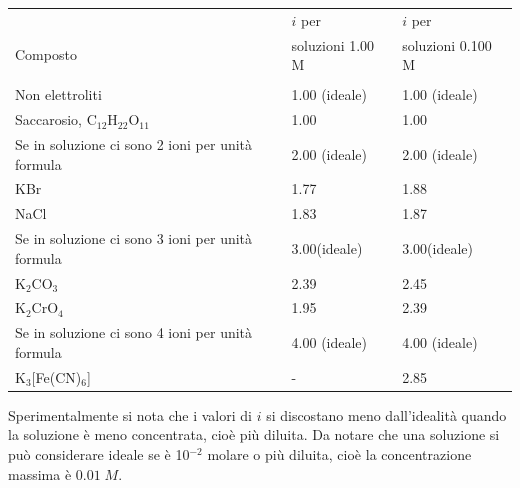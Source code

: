 \begin{center}
    \begin{tabular}{p{9cm}p{3.5cm}p{3.5cm}}
        & \hspace{1cm}$i$ per & \hspace{1cm}$i$ per\\
        Composto & soluzioni 1.00 M & soluzioni 0.100 M\\[0.5 ex]
        \hline\\[-0.4cm]
        Non elettroliti & 1.00 (ideale) & 1.00 (ideale)\\[0.5 ex]
        Saccarosio, C$_{12}$H$_{22}$O$_{11}$ & 1.00 & 1.00\\[0.5 ex]
        Se in soluzione ci sono 2 ioni per unità formula & 2.00 (ideale) & 2.00 (ideale)\\[0.5 ex]
        KBr & 1.77 & 1.88\\[0.5 ex]
        NaCl & 1.83 & 1.87\\[0.5 ex]
        Se in soluzione ci sono 3 ioni per unità formula & 3.00(ideale) & 3.00(ideale)\\[0.5 ex]
        K$_2$CO$_3$ & 2.39 & 2.45 \\[0.5 ex]
        K$_2$CrO$_4$ & 1.95 & 2.39\\[0.5 ex]
        Se in soluzione ci sono 4 ioni per unità formula & 4.00 (ideale) & 4.00 (ideale)\\[0.5 ex]
        K$_3$[Fe(CN)$_6$] & - & 2.85\\[0.5 ex]
    \end{tabular}
\end{center}

Sperimentalmente si nota che i valori di $i$ si discostano meno dall'idealità quando la soluzione è meno concentrata, cioè più diluita. Da notare che una soluzione si può considerare ideale se è 10$^{-2}$ molare o più diluita, cioè la concentrazione massima è $0.01\;M$.